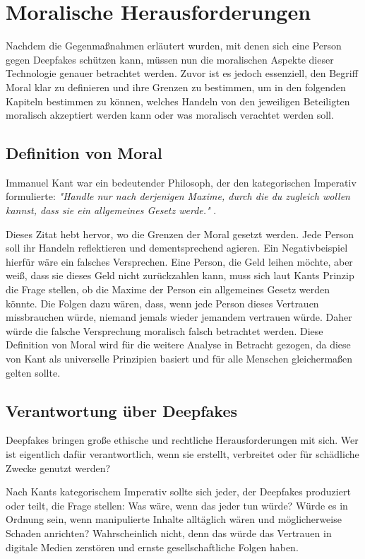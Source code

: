 \documentclass[a4paper,12pt]{article}
\begin{document}
\newpage

\section{Moralische Herausforderungen}
Nachdem die Gegenmaßnahmen erläutert wurden, mit denen sich eine Person gegen Deepfakes schützen kann, müssen nun die moralischen Aspekte dieser Technologie genauer betrachtet werden.
Zuvor ist es jedoch essenziell, den Begriff Moral klar zu definieren und ihre Grenzen zu bestimmen, um in den folgenden Kapiteln bestimmen zu können, welches Handeln von den jeweiligen Beteiligten  moralisch akzeptiert werden kann oder was moralisch verachtet werden soll.

\subsection{Definition von Moral}
Immanuel Kant war ein bedeutender Philosoph, der den kategorischen Imperativ formulierte:
\textit{"Handle nur nach derjenigen Maxime, durch die du zugleich wollen kannst, dass sie ein allgemeines Gesetz werde."} \cite{KantMetaphysik}.

Dieses Zitat hebt hervor, wo die Grenzen der Moral gesetzt werden. Jede Person soll ihr Handeln reflektieren und dementsprechend agieren.
Ein Negativbeispiel hierfür wäre ein falsches Versprechen. Eine Person, die Geld leihen möchte, aber weiß, dass sie dieses Geld nicht zurückzahlen kann, muss sich laut Kants Prinzip die Frage stellen, ob die Maxime der Person ein allgemeines Gesetz werden könnte. Die Folgen dazu wären, dass, wenn jede Person dieses Vertrauen missbrauchen würde, niemand jemals wieder jemandem vertrauen würde. Daher würde die falsche Versprechung moralisch falsch betrachtet werden. \cite{KantMetaphysik}
Diese Definition von Moral wird für die weitere Analyse in Betracht gezogen, da diese von Kant als universelle Prinzipien basiert und für alle Menschen gleichermaßen gelten sollte.

\subsection{Verantwortung über Deepfakes}
Deepfakes bringen große ethische und rechtliche Herausforderungen mit sich. Wer ist eigentlich dafür verantwortlich, wenn sie erstellt, verbreitet oder für schädliche Zwecke genutzt werden?

Nach Kants kategorischem Imperativ sollte sich jeder, der Deepfakes produziert oder teilt, die Frage stellen: Was wäre, wenn das jeder tun würde? Würde es in Ordnung sein, wenn manipulierte Inhalte alltäglich wären und möglicherweise Schaden anrichten? Wahrscheinlich nicht, denn das würde das Vertrauen in digitale Medien zerstören und ernste gesellschaftliche Folgen haben.\cite{KantMetaphysik}
\end{document}
